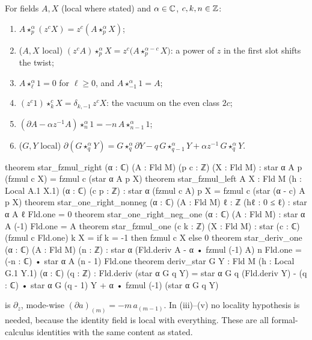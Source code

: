 \begin{proposition}\label{ch07:prop:staraux}
For fields $A, X$ (local where stated) and $\alpha\in{\mathbb{C}}$, $c,k,n\in{\mathbb{Z}}$:
\begin{enumerate}[label=(\roman*)]
  \item $A\star^\alpha_p(z^cX) = z^c(A\star^\alpha_pX)$;
  \item ($A,X$ local) $(z^cA)\star^\alpha_pX = z^c\bigl(A\star^{\alpha-c}_pX\bigr)$: a power of $z$
  in the first slot shifts the twist;
  \item $A\star^\alpha_\ell 1 = 0$ for $\ell\ge0$, and $A\star^\alpha_{-1}1 = A$;
  \item $(z^c1)\star^{c}_kX = \delta_{k,-1}\,z^cX$: the vacuum on the even class $2c$;
  \item $(\partial A-\alpha z^{-1}A)\star^\alpha_n1 = -n\,A\star^\alpha_{n-1}1$;
  \item ($G,Y$ local) $\partial(G\star^\alpha_qY) = G\star^\alpha_q\partial Y -
  q\,G\star^\alpha_{q-1}Y + \alpha z^{-1}\,G\star^\alpha_qY$.
\end{enumerate}
\end{proposition}

\begin{leancode}
theorem star_fzmul_right (α : ℂ) (A : Fld M) (p c : ℤ) (X : Fld M) :
    star α A p (fzmul c X) = fzmul c (star α A p X)
theorem star_fzmul_left {A X : Fld M} (h : Local A.1 X.1) (α : ℂ) (c p : ℤ) :
    star α (fzmul c A) p X = fzmul c (star (α - c) A p X)
theorem star_one_right_nonneg (α : ℂ) (A : Fld M) {ℓ : ℤ} (hℓ : 0 ≤ ℓ) :
    star α A ℓ Fld.one = 0
theorem star_one_right_neg_one (α : ℂ) (A : Fld M) : star α A (-1) Fld.one = A
theorem star_fzmul_one (c k : ℤ) (X : Fld M) :
    star (c : ℂ) (fzmul c Fld.one) k X = if k = -1 then fzmul c X else 0
theorem star_deriv_one (α : ℂ) (A : Fld M) (n : ℤ) :
    star α (Fld.deriv A - α • fzmul (-1) A) n Fld.one
      = (-n : ℂ) • star α A (n - 1) Fld.one
theorem deriv_star {G Y : Fld M} (h : Local G.1 Y.1) (α : ℂ) (q : ℤ) :
    Fld.deriv (star α G q Y)
      = star α G q (Fld.deriv Y) - (q : ℂ) • star α G (q - 1) Y
        + α • fzmul (-1) (star α G q Y)
\end{leancode}

\begin{dictionary}
 is $\partial_z$, mode-wise $(\partial a)_{(m)} = -m\,a_{(m-1)}$. In (iii)--(v)
no locality hypothesis is needed, because the identity field is local with everything. These
are all formal-calculus identities with the same content as stated.
\end{dictionary}

